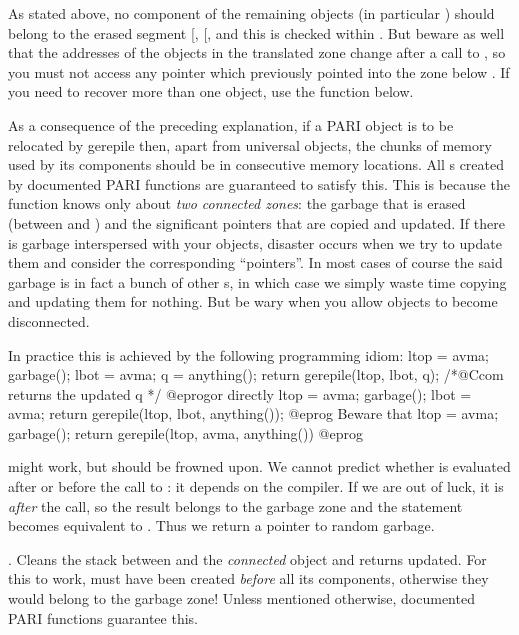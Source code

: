As stated above, no component of the remaining objects (in particular
) should belong to the erased segment [, [, and
this is checked within . But beware as well that the addresses
of the objects in the translated zone change after a call to ,
so you must not access any pointer which previously pointed into the zone
below . If you need to recover more than one object, use the
 function below.

As a consequence of the preceding explanation, if a PARI object is to be
relocated by \hbox{gerepile} then, apart from universal objects, the chunks
of memory used by its components should be in consecutive memory locations.
All s created by documented PARI functions are guaranteed to satisfy
this. This is because the  function knows only about \emph{two
connected zones}: the garbage that is erased (between  and
) and the significant pointers that are copied and updated. If
there is garbage interspersed with your objects, disaster occurs when we try
to update them and consider the corresponding ``pointers''. In most cases of
course the said garbage is in fact a bunch of other s, in which case
we simply waste time copying and updating them for nothing. But be wary when
you allow objects to become disconnected.

\noindent In practice this is achieved by the following programming idiom:
\bprog
  ltop = avma; garbage(); lbot = avma; q = anything();
  return gerepile(ltop, lbot, q); /*@Ccom returns the updated q */
@eprog\noindent or directly
\bprog
  ltop = avma; garbage(); lbot = avma;
  return gerepile(ltop, lbot, anything());
@eprog\noindent
Beware that
\bprog
  ltop = avma; garbage();
  return gerepile(ltop, avma, anything())
@eprog

\noindent might work, but should be frowned upon. We cannot predict whether
 is evaluated after or before the call to : it
depends on the compiler. If we are out of luck, it is \emph{after} the
call, so the result belongs to the garbage zone and the 
statement becomes equivalent to . Thus we return a
pointer to random garbage.


. Cleans the stack between
 and the \emph{connected} object  and returns 
updated. For this to work,  must have been created \emph{before} all
its components, otherwise they would belong to the garbage zone! Unless
mentioned otherwise, documented PARI functions guarantee this.

